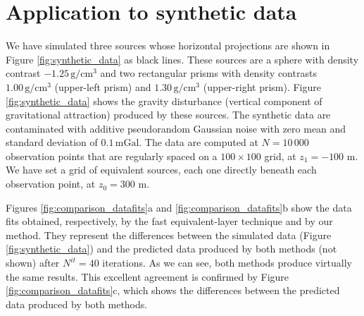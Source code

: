 \section{Application to synthetic data}

We have simulated three sources whose horizontal projections are shown in 
Figure \ref{fig:synthetic_data} as black lines. 
These sources are a sphere with density contrast  
$-1.25\, \mathrm{g/cm^3}$ and two rectangular prisms with density contrasts 
$1.00\, \mathrm{g/cm^3}$ (upper-left prism) 
and $1.30\, \mathrm{g/cm^3}$ (upper-right prism). 
Figure \ref{fig:synthetic_data} shows the gravity disturbance (vertical component of 
gravitational attraction) produced by these sources. 
The synthetic data are contaminated with additive pseudorandom Gaussian 
noise with zero mean and standard deviation of $0.1 \, \mathrm{mGal}$.
The data are computed at $N = 10\,000$ observation points that are regularly spaced on a 
$100 \times 100$ grid, at $z_{1} = -100$ m. 
We have set a grid of equivalent sources, each one directly beneath each 
observation point, at $z_{0} = 300$ m. 

Figures \ref{fig:comparison_datafits}a and \ref{fig:comparison_datafits}b show the data fits 
obtained, respectively, by the fast equivalent-layer technique \citep{siqueira-etal2017} 
and by our method. They represent the differences between the simulated data (Figure \ref{fig:synthetic_data}) and the predicted data produced by both methods 
(not shown) after $N^{it} = 40$ iterations. 
As we can see, both methods produce virtually the same results.
This excellent agreement is confirmed by Figure \ref{fig:comparison_datafits}c, which shows 
the differences between the predicted data produced by both methods.

